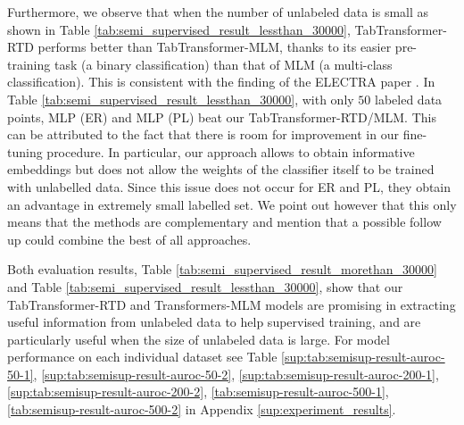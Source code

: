 Furthermore, we observe that when the number of unlabeled data is small as shown in Table \ref{tab:semi_supervised_result_lessthan_30000}, TabTransformer-RTD performs better than TabTransformer-MLM, thanks to its easier pre-training task (a binary classification) than that of MLM (a multi-class classification).
This is consistent with the finding of the ELECTRA paper \citep{clark_electra_2020}. In Table \ref{tab:semi_supervised_result_lessthan_30000}, with only $50$ labeled data points, MLP (ER) and MLP (PL) beat our TabTransformer-RTD/MLM. This can be attributed to the fact that there is room for improvement in our fine-tuning procedure. In particular, our approach allows to obtain informative embeddings but does not allow the weights of the classifier itself to be trained with unlabelled data. Since this issue does not occur for ER and PL, they obtain an advantage in extremely small labelled set. We point out however that this only means that the methods are complementary and mention that a possible follow up could combine the best of all approaches. %

Both evaluation results, Table \ref{tab:semi_supervised_result_morethan_30000} and Table \ref{tab:semi_supervised_result_lessthan_30000}, show that our 
TabTransformer-RTD and Transformers-MLM models are promising in extracting useful information from unlabeled data to help supervised training, and are particularly useful when the size of unlabeled data is large. For model performance on each individual dataset see Table \ref{sup:tab:semisup-result-auroc-50-1}, \ref{sup:tab:semisup-result-auroc-50-2},
\ref{sup:tab:semisup-result-auroc-200-1}, \ref{sup:tab:semisup-result-auroc-200-2},
\ref{tab:semisup-result-auroc-500-1}, \ref{tab:semisup-result-auroc-500-2}
in Appendix \ref{sup:experiment_results}.

